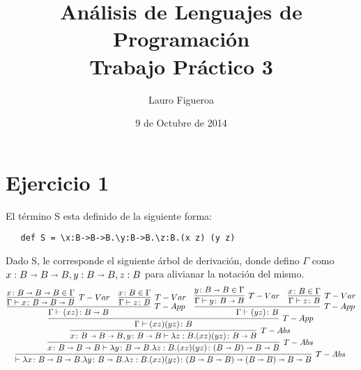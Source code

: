 \documentclass[a4paper,12pt]{article}
\begin{document}
\title{Análisis de Lenguajes de Programación\\ 
        Trabajo Práctico 3}
\author{Lauro Figueroa}
\date{9 de Octubre de 2014}
\maketitle

\newpage
{}

\section*{Ejercicio 1}

El término S esta definido de la siguiente forma: 
\begin{verbatim}
   def S = \x:B->B->B.\y:B->B.\z:B.(x z) (y z)
\end{verbatim}

Dado S, le corresponde el siguiente árbol de derivación, donde defino $\Gamma$ como 
$x: B \shortrightarrow B\shortrightarrow B, y: B\shortrightarrow B, z: B $
para alivianar la notación del mismo.\\

$$
\vcenter{
\infer[T-Abs]{\vdash \lambda x\colon B \shortrightarrow B\shortrightarrow B.  \lambda y\colon B\shortrightarrow B.\lambda z:B.(x z) (y z) \colon (B \shortrightarrow B \shortrightarrow B) \shortrightarrow (B \shortrightarrow B) \shortrightarrow B \shortrightarrow B}{
  \infer[T-Abs]{x\colon B \shortrightarrow B\shortrightarrow B \vdash \lambda y\colon B\shortrightarrow B.\lambda z:B.(x z) (y z) \colon (B \shortrightarrow B) \shortrightarrow B \shortrightarrow B}{
    \infer[T-Abs]{x\colon B \shortrightarrow B\shortrightarrow B,y\colon B\shortrightarrow B \vdash \lambda z:B.(x z) (y z) \colon B \shortrightarrow B }{
        \infer[T-App]{\Gamma \vdash  (x z) (y z)\colon B}{ 
              \infer[T-App]{ \Gamma \vdash (x z)\colon B \shortrightarrow B} {
                \infer[T-Var]{\Gamma \vdash x\colon B \shortrightarrow B\shortrightarrow B} {x\colon B \shortrightarrow B\shortrightarrow B \in \Gamma}
                &
                \infer[T-Var]{\Gamma \vdash z\colon B} {x\colon B \in \Gamma}
              }
              &
              \infer[T-App]{\Gamma \vdash (y z)\colon B} {
                \infer[T-Var]{\Gamma \vdash y\colon B\shortrightarrow B} {y\colon B\shortrightarrow B \in \Gamma} {}
                &
                \infer[T-Var]{\Gamma \vdash z\colon B} {x\colon B \in \Gamma} {} 
              }
        }
    }
  }
  }
}
$$
\end{document}
